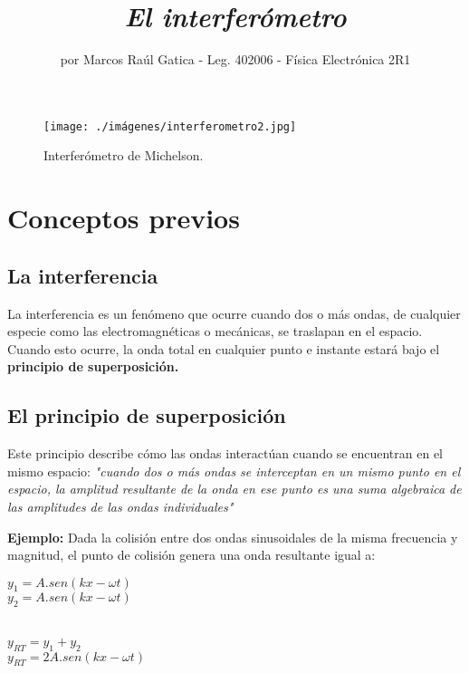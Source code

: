 \documentclass[a4paper, 12pt]{article}
\title{\textbf{\textit{El interferómetro}}}
\author{por Marcos Raúl Gatica - Leg. 402006 - Física Electrónica 2R1}
\date{}
\begin{document}
	\thispagestyle{fancy}
	\maketitle
	\thispagestyle{empty}
	\begin{figure}[h!]
		\centering
		\texttt{[image: ./imágenes/interferometro2.jpg]}
		\caption{Interferómetro de Michelson.}
		\label{fig:interferometro}
	\end{figure}
	
	\newpage
	
	\setcounter{page}{1}
	\tableofcontents

	\newpage
	
	\section{\textbf{Conceptos previos}}
	
	\subsection{La interferencia}
	\indent La interferencia es un fenómeno que ocurre cuando dos o más ondas, de cualquier especie como las electromagnéticas o mecánicas, se traslapan en el espacio. Cuando esto ocurre, la onda total en cualquier punto e instante estará bajo el \textbf{principio de superposición.}
	
	\subsection{El principio de superposición}
	\indent Este principio describe cómo las ondas interactúan cuando se encuentran en el mismo espacio: \textit{"cuando dos o más ondas se interceptan en un mismo punto en el espacio, la amplitud resultante de la onda en ese punto es una suma algebraica de las amplitudes de las ondas individuales"}
	
	\textbf{Ejemplo:} \newline
	\indent Dada la colisión entre dos ondas sinusoidales de la misma frecuencia y magnitud, el punto de colisión genera una onda resultante igual a:
	
	\begin{center}
		${y_1} = A.sen(kx - \omega t)$ \\ 
		${y_2} = A.sen(kx - \omega t)$ \\ \
		
		${y_{RT}} = {y_1} + {y_2}$ \\
		${y_{RT}} = 2A.sen(kx - \omega t)$ \\
	\end{center}
\end{document}
